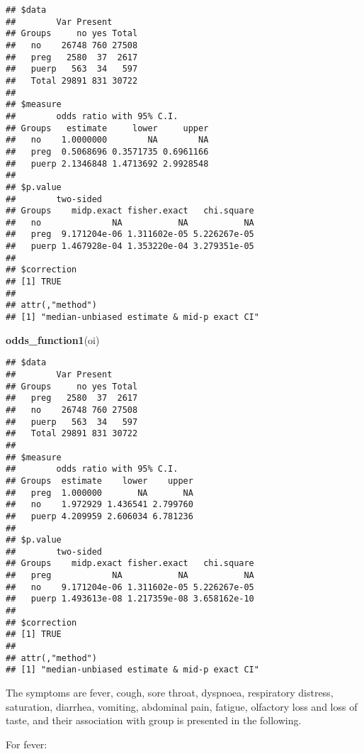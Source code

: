 \documentclass[
]{article}
\newenvironment{Shaded}{\begin{snugshade}}{\end{snugshade}}
\newcommand{\DataTypeTok}[1]{\textcolor[rgb]{0.13,0.29,0.53}{#1}}
\newcommand{\KeywordTok}[1]{\textcolor[rgb]{0.13,0.29,0.53}{\textbf{#1}}}
\newcommand{\NormalTok}[1]{#1}
\newcommand{\OperatorTok}[1]{\textcolor[rgb]{0.81,0.36,0.00}{\textbf{#1}}}
\newcommand{\OtherTok}[1]{\textcolor[rgb]{0.56,0.35,0.01}{#1}}
\newcommand{\StringTok}[1]{\textcolor[rgb]{0.31,0.60,0.02}{#1}}
\begin{document}
\begin{verbatim}
## $data
##        Var Present
## Groups     no yes Total
##   no    26748 760 27508
##   preg   2580  37  2617
##   puerp   563  34   597
##   Total 29891 831 30722
## 
## $measure
##        odds ratio with 95% C.I.
## Groups   estimate     lower     upper
##   no    1.0000000        NA        NA
##   preg  0.5068696 0.3571735 0.6961166
##   puerp 2.1346848 1.4713692 2.9928548
## 
## $p.value
##        two-sided
## Groups    midp.exact fisher.exact   chi.square
##   no              NA           NA           NA
##   preg  9.171204e-06 1.311602e-05 5.226267e-05
##   puerp 1.467928e-04 1.353220e-04 3.279351e-05
## 
## $correction
## [1] TRUE
## 
## attr(,"method")
## [1] "median-unbiased estimate & mid-p exact CI"
\end{verbatim}

\begin{Shaded}
\begin{Highlighting}[]
\KeywordTok{odds_function1}\NormalTok{(oi)}
\end{Highlighting}
\end{Shaded}

\begin{verbatim}
## $data
##        Var Present
## Groups     no yes Total
##   preg   2580  37  2617
##   no    26748 760 27508
##   puerp   563  34   597
##   Total 29891 831 30722
## 
## $measure
##        odds ratio with 95% C.I.
## Groups  estimate    lower    upper
##   preg  1.000000       NA       NA
##   no    1.972929 1.436541 2.799760
##   puerp 4.209959 2.606034 6.781236
## 
## $p.value
##        two-sided
## Groups    midp.exact fisher.exact   chi.square
##   preg            NA           NA           NA
##   no    9.171204e-06 1.311602e-05 5.226267e-05
##   puerp 1.493613e-08 1.217359e-08 3.658162e-10
## 
## $correction
## [1] TRUE
## 
## attr(,"method")
## [1] "median-unbiased estimate & mid-p exact CI"
\end{verbatim}

The symptoms are fever, cough, sore throat, dyspnoea, respiratory
distress, saturation, diarrhea, vomiting, abdominal pain, fatigue,
olfactory loss and loss of taste, and their association with group is
presented in the following.

For fever:

\begin{Shaded}
\end{Shaded}
\end{document}
